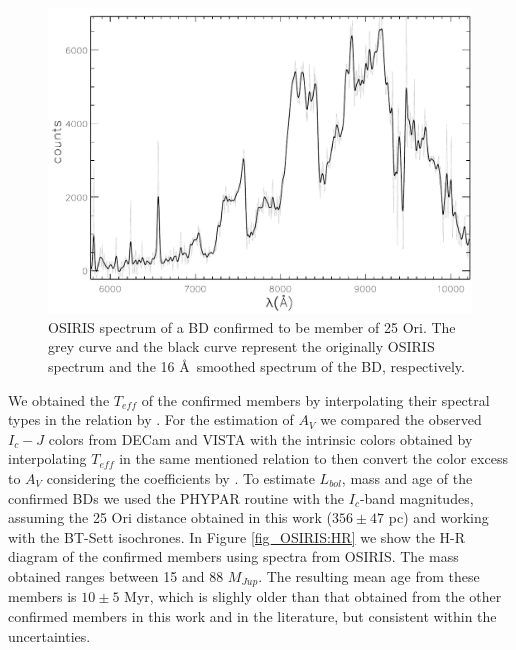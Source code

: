 \documentclass[12pt]{article}
\newcounter{subsubsubsection}[subsubsection]
\begin{document}
\begin{figure}[ht!]
	\includegraphics[width=1.0\textwidth]{member_OSIRIS.pdf}
	\caption[OSIRIS spectrum of a BD confirmed to be member of 25 Ori.]{OSIRIS spectrum of a BD confirmed to be member of 25 Ori. The grey curve and the black curve represent the originally OSIRIS spectrum and the 16 \AA\ smoothed spectrum of the BD, respectively.}
	\label{fig_OSIRIS:spectrum}
\end{figure}

\label{sec_OSIRIS:parameters}
We obtained the $T_{eff}$ of the confirmed members by interpolating their spectral types in the relation by \citet{Pecaut2013}. For the estimation of $A_V$ we compared the observed $I_c-J$ colors from DECam and VISTA with the intrinsic colors obtained by interpolating $T_{eff}$ in the same mentioned relation to then convert the color excess to $A_V$ considering the coefficients by \citet{Cardelli1989}. To estimate $L_{bol}$, mass and age of the confirmed BDs we used the PHYPAR routine with the $I_c$-band magnitudes, assuming the 25 Ori distance obtained in this work ($356\pm47$ pc) and working with the BT-Sett isochrones. In Figure \ref{fig_OSIRIS:HR} we show the H-R diagram of the confirmed members using spectra from OSIRIS. The mass obtained ranges between 15 and 88 $M_{Jup}$. The resulting mean age from these members is $10\pm5$ Myr, which is slighly older than that obtained from the other confirmed members in this work and in the literature, but consistent within the uncertainties.
\end{document}
